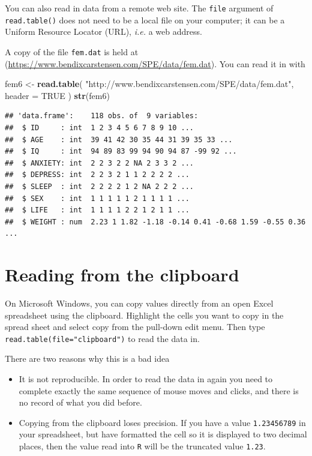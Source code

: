 \documentclass[
]{book}
\newenvironment{Shaded}{\begin{snugshade}}{\end{snugshade}}
\newcommand{\AttributeTok}[1]{\textcolor[rgb]{0.13,0.29,0.53}{#1}}
\newcommand{\ConstantTok}[1]{\textcolor[rgb]{0.56,0.35,0.01}{#1}}
\newcommand{\FunctionTok}[1]{\textcolor[rgb]{0.13,0.29,0.53}{\textbf{#1}}}
\newcommand{\NormalTok}[1]{#1}
\newcommand{\OtherTok}[1]{\textcolor[rgb]{0.56,0.35,0.01}{#1}}
\newcommand{\StringTok}[1]{\textcolor[rgb]{0.31,0.60,0.02}{#1}}
\providecommand{\tightlist}{%
  \setlength{\itemsep}{0pt}\setlength{\parskip}{0pt}}
\begin{document}
You can also read in data from a remote web site. The \texttt{file}
argument of \texttt{read.table()} does not need to be a local file on
your computer; it can be a Uniform Resource Locator (URL), \emph{i.e.}
a web address.

A copy of the file \texttt{fem.dat} is held at
(\url{https://www.bendixcarstensen.com/SPE/data/fem.dat}). You can
read it in with

\begin{Shaded}
\begin{Highlighting}[]
\NormalTok{fem6 }\OtherTok{\textless{}{-}} 
  \FunctionTok{read.table}\NormalTok{(}
    \StringTok{"http://www.bendixcarstensen.com/SPE/data/fem.dat"}\NormalTok{,}
    \AttributeTok{header =} \ConstantTok{TRUE}
\NormalTok{  )}
\FunctionTok{str}\NormalTok{(fem6)}
\end{Highlighting}
\end{Shaded}

\begin{verbatim}
## 'data.frame':    118 obs. of  9 variables:
##  $ ID     : int  1 2 3 4 5 6 7 8 9 10 ...
##  $ AGE    : int  39 41 42 30 35 44 31 39 35 33 ...
##  $ IQ     : int  94 89 83 99 94 90 94 87 -99 92 ...
##  $ ANXIETY: int  2 2 3 2 2 NA 2 3 3 2 ...
##  $ DEPRESS: int  2 2 3 2 1 1 2 2 2 2 ...
##  $ SLEEP  : int  2 2 2 2 1 2 NA 2 2 2 ...
##  $ SEX    : int  1 1 1 1 1 2 1 1 1 1 ...
##  $ LIFE   : int  1 1 1 1 2 2 1 2 1 1 ...
##  $ WEIGHT : num  2.23 1 1.82 -1.18 -0.14 0.41 -0.68 1.59 -0.55 0.36 ...
\end{verbatim}

\section{Reading from the clipboard}\label{reading-from-the-clipboard}

On Microsoft Windows, you can copy values directly from an open Excel
spreadsheet using the clipboard. Highlight the cells you want to copy
in the spread sheet and select copy from the pull-down edit menu. Then
type \texttt{read.table(file="clipboard")} to read the data in.

There are two reasons why this is a bad idea

\begin{itemize}
\tightlist
\item
  It is not reproducible. In order to read the data in again you
  need to complete exactly the same sequence of mouse moves and clicks,
  and there is no record of what you did before.
\item
  Copying from the clipboard loses precision. If you have a value
  \texttt{1.23456789} in your spreadsheet, but have formatted the cell so it
  is displayed to two decimal places, then the value read into
  \texttt{R} will be the truncated value \texttt{1.23}.
\end{itemize}
\end{document}

